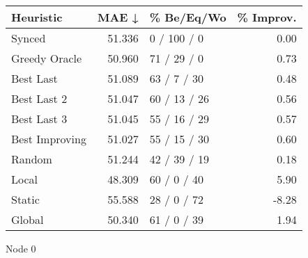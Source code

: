 \begin{tabular}{lrlr}
\toprule
\textbf{Heuristic} & \textbf{MAE ↓} & \textbf{\% Be/Eq/Wo} & \textbf{\% Improv.} \\
\midrule
            Synced &         51.336 &          0 / 100 / 0 &                0.00 \\
     Greedy Oracle &         50.960 &          71 / 29 / 0 &                0.73 \\
         Best Last &         51.089 &          63 / 7 / 30 &                0.48 \\
       Best Last 2 &         51.047 &         60 / 13 / 26 &                0.56 \\
       Best Last 3 &         51.045 &         55 / 16 / 29 &                0.57 \\
    Best Improving &         51.027 &         55 / 15 / 30 &                0.60 \\
            Random &         51.244 &         42 / 39 / 19 &                0.18 \\
             Local &         48.309 &          60 / 0 / 40 &                5.90 \\
            Static &         55.588 &          28 / 0 / 72 &               -8.28 \\
            Global &         50.340 &          61 / 0 / 39 &                1.94 \\
\bottomrule
\end{tabular}
\caption{Node 0}
\label{tab:non_lr01_le1_bs4_0}
